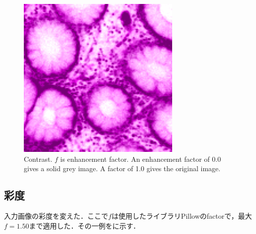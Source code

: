 \begin{figure}[H]
\begin{minipage}{0.25\columnwidth}
	\end{minipage}
	\begin{minipage}{0.25\columnwidth}
		\centering
		\includegraphics[clip, width=\linewidth]{fig/preprocessing/data_aug/color/CONTRAST/CONTRAST_1_50}
	\end{minipage}	
	
	\caption{Contrast. $f$ is enhancement factor. An enhancement factor of 0.0 gives a solid grey image. A factor of 1.0 gives the original image.}
	\label{fig:コントラスト}
	
\end{figure}

\subsection*{彩度}
入力画像の彩度を変えた．ここで$f$は使用したライブラリPillowのfactorで，最大$f=1.50$まで適用した．その一例をに示す．

